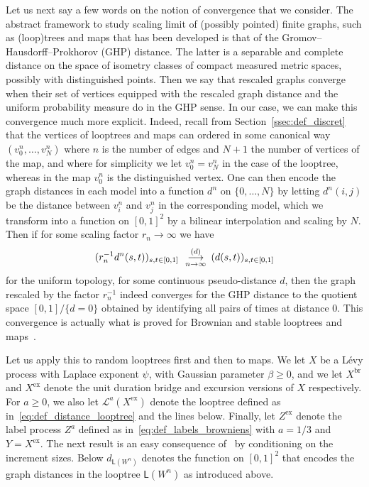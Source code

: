 \documentclass[british, a4paper,11pt]{article}
\numberwithin{equation}{section}
\theoremstyle{definition}
\newcommand{\Loop}{\mathscr{L}}
\newcommand{\Loopd}{\mathsf{L}}
\newcommand{\cvloi}[1][n]{\enskip\mathop{\longrightarrow}^{(d)}_{#1 \to \infty}\enskip}
\newcommand{\exc}{\mathrm{ex}}
\newcommand{\br}{\mathrm{br}}
\begin{document}
Let us next say a few words on the notion of convergence that we consider.
The abstract framework to study scaling limit of (possibly pointed) finite graphs, such as (loop)trees and maps that has been developed is that of the Gromov--Hausdorff--Prokhorov (GHP) distance.
The latter is a separable and complete distance on the space of isometry classes of compact measured metric spaces, possibly with distinguished points. 
Then we say that rescaled graphs converge when their set of vertices equipped with the rescaled graph distance and the uniform probability measure do in the GHP sense.
In our case, we can make this convergence much more explicit.
Indeed, recall from Section~\ref{ssec:def_discret} that the vertices of looptrees and maps can ordered in some canonical way $(v^n_0, \dots, v^n_N)$ where $n$ is the number of edges and $N+1$ the number of vertices of the map, and where for simplicity we let $v^n_0=v^n_N$ in the case of the looptree, whereas in the map $v^n_0$ is the distinguished vertex.
One can then encode the graph distances in each model into a function $d^n$ on $\{0, \dots, N\}$ by letting $d^n(i,j)$ be the distance between $v^n_i$ and $v^n_j$ in the corresponding model, which we transform into a function on $[0,1]^2$ by a bilinear interpolation and scaling by $N$.
Then if for some scaling factor $r_n\to\infty$ we have
\[(r_n^{-1} d^n(s, t))_{s,t \in [0,1]} \cvloi (d(s,t))_{s,t \in [0,1]}\]
for the uniform topology, for some continuous pseudo-distance $d$, then 
the graph rescaled by the factor $r_n^{-1}$ indeed converges for the GHP distance to the quotient space $[0,1] / \{d=0\}$ obtained by identifying all pairs of times at distance $0$.
This convergence is actually what is proved for Brownian and stable looptrees and maps~\cite{LG13,Mie13,CK15,CMR25}.


Let us apply this to random looptrees first and then to maps.
We let $X$ be a L\'evy process with Laplace exponent $\psi$, with Gaussian parameter $\beta \geq 0$, and we let $X^{\br}$ and $X^{\exc}$ denote the unit duration bridge and excursion versions of $X$ respectively. 
For $a \ge 0$, we also let $\Loop^a(X^{\exc})$ denote the looptree defined as in~\eqref{eq:def_distance_looptree} and the lines below.
Finally, let $Z^{\exc}$ denote the label process $Z^a$ defined as in~\eqref{eq:def_labels_browniens} with $a=1/3$ and $Y=X^{\exc}$.
The next result is an easy consequence of~\cite[Theorems~7.4 and~7.9]{Mar24} by conditioning on the increment sizes. 
Below $d_{\Loopd(W^{n})}$ denotes the function on $[0,1]^2$ that encodes the graph distances in the looptree $\Loopd(W^{n})$ as introduced above.
\end{document}
